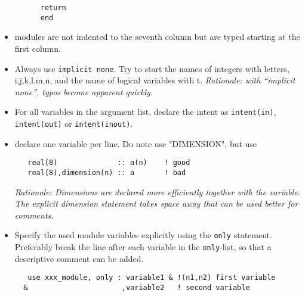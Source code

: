 \documentclass[11pt,a4paper]{report}
\begin{document}
\begin{itemize}
\begin{verbatim}
      return
      end
\end{verbatim}
%
\item modules are not indented to the seventh column but are typed
 starting at the first column.
%
\item Always use \verb|implicit none|. Try to start the names of
  integers with letters, i,j,k,l,m,n, and the name of logical
  variables with t. \textit{Rationale: with ``implicit none'',
    typos become apparent quickly.}
%
\item For all variables in the argument list, declare the intent as
  \verb|intent(in)|, \verb|intent(out)| or \verb|intent(inout)|.
%
\item declare one variable per line. Do note use "DIMENSION", but use
\begin{verbatim}
   real(8)              :: a(n)    ! good
   real(8),dimension(n) :: a       ! bad
\end{verbatim}
\textit{Rationale: Dimensions are declared more efficiently together
  with the variable. The explicit dimension statement takes space away
  that can be used better for comments.}
%
\item Specify the used module variables explicitly using the
  \verb|only| statement. Preferably break the line after each variable
  in the \verb|only|-list, so that a descriptive comment can be added.
\begin{verbatim}
   use xxx_module, only : variable1 & !(n1,n2) first variable
  &                      ,variable2   ! second variable


\end{verbatim}
\end{itemize}
\end{document}
